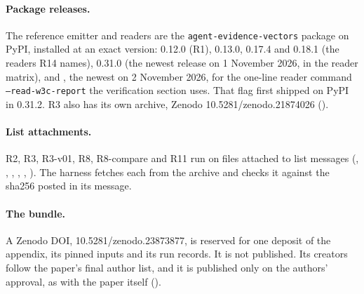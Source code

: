 \paragraph{Package releases.} The reference emitter and readers are the \texttt{agent-evidence-vectors} package on PyPI, installed at an exact version: 0.12.0 (R1), 0.13.0, 0.17.4 and 0.18.1 (the readers R14 names), 0.31.0 (the newest release on 1 November 2026, in the reader matrix), and \aevreadrelease, the newest on 2 November 2026, for the one-line reader command \texttt{--read-w3c-report} the verification section uses. That flag first shipped on PyPI in 0.31.2. R3 also has its own archive, Zenodo 10.5281/zenodo.21874026 ().

\paragraph{List attachments.} R2, R3, R3-v01, R8, R8-compare and R11 run on files attached to list messages (, , , , , ). The harness fetches each from the archive and checks it against the sha256 posted in its message.

\paragraph{The bundle.} A Zenodo DOI, 10.5281/zenodo.23873877, is reserved for one deposit of the appendix, its pinned inputs and its run records. It is not published. Its creators follow the paper's final author list, and it is published only on the authors' approval, as with the paper itself ().
